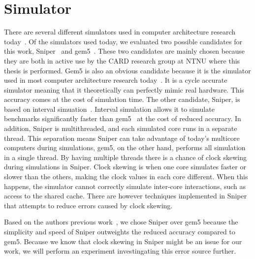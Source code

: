 \section{Simulator}
\label{sec:methodology:simulator}

There are several different simulators used in computer architecture research today~\cite{Carlson2011a, Binkert2011, Miller2010, Pellauer2011}.
Of the simulators used today, we evaluated two possible candidates for this work, Sniper~\cite{Carlson2011a} and gem5~\cite{Binkert2011}.
These two candidates are mainly chosen because they are both in active use by the CARD research group at NTNU where this thesis is performed.
Gem5 is also an obvious candidate because it is the simulator used in most computer architecture research today~\cite{Chen-Han2014}.
It is a cycle accurate simulator meaning that it theoretically can perfectly mimic real hardware.
This accuracy comes at the cost of simulation time.
The other candidate, Sniper, is based on interval simuation~\cite{Genbrugge2010}. 
Interval simulation allows it to simulate benchmarks significantly faster than gem5~\cite{Carlson2011a, Olsen2014} at the cost of reduced accuracy.
In addition, Sniper is multithreaded, and each simulated core runs in a separate thread.
This separation means Sniper can take advantage of today's multicore computers during simulations, gem5, on the other hand, performs all simulation in a single thread.
By having multiple threads there is a chance of clock skewing~\cite{Carlson2011a} during simulations in Sniper.
Clock skewing is when one core simulates faster or slower than the others, making the clock values in each core different.
When this happens, the simulator cannot correctly simulate inter-core interactions, such as access to the shared cache.
There are however techniques implemented in Sniper that attempts to reduce errors caused by clock skewing.

Based on the authors previous work~\cite{Olsen2014}, we chose Sniper over gem5 because the simplicity and speed of Sniper outweights the reduced accuracy compared to gem5.
Because we know that clock skewing in Sniper might be an issue for our work, we will perform an experiment investingating this error source further.
